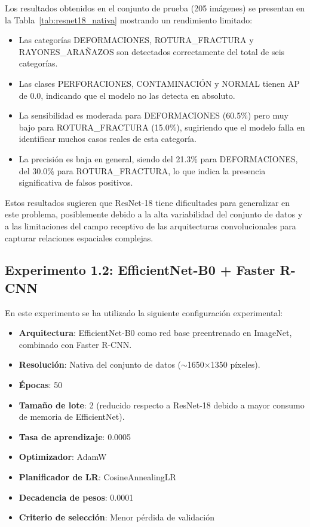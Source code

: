 Los resultados obtenidos en el conjunto de prueba (205 imágenes) se presentan en la Tabla~\ref{tab:resnet18_nativa} mostrando un rendimiento limitado:
\begin{itemize}
    \item Las categorías DEFORMACIONES, \mbox{ROTURA\_FRACTURA} y \mbox{RAYONES\_ARAÑAZOS} son detectados correctamente del total de seis categorías.
    \item Las clases PERFORACIONES, CONTAMINACIÓN y NORMAL tienen AP de 0.0, indicando que el modelo no las detecta en absoluto.
    \item La sensibilidad es moderada para DEFORMACIONES (60.5\%) pero muy bajo para \mbox{ROTURA\_FRACTURA} (15.0\%), sugiriendo que el modelo falla en identificar muchos casos reales de esta categoría.
    \item La precisión es baja en general, siendo del 21.3\% para DEFORMACIONES, del 30.0\% para \mbox{ROTURA\_FRACTURA}, lo que indica la presencia significativa de falsos positivos.
\end{itemize}

Estos resultados sugieren que ResNet-18 tiene dificultades para generalizar en este problema, posiblemente debido a la alta variabilidad del conjunto de datos y a las limitaciones del campo receptivo de las arquitecturas convolucionales para capturar relaciones espaciales complejas.

\subsection{Experimento 1.2: EfficientNet-B0 + Faster R-CNN}

En este experimento se ha utilizado la siguiente configuración experimental:
\begin{itemize}
    \item \textbf{Arquitectura}: EfficientNet-B0 como red base preentrenado en ImageNet, combinado con Faster R-CNN.
    \item \textbf{Resolución}: Nativa del conjunto de datos ($\sim$1650×1350 píxeles).
    \item \textbf{Épocas}: 50
    \item \textbf{Tamaño de lote}: 2 (reducido respecto a ResNet-18 debido a mayor consumo de memoria de EfficientNet).
    \item \textbf{Tasa de aprendizaje}: 0.0005
    \item \textbf{Optimizador}: AdamW
    \item \textbf{Planificador de LR}: CosineAnnealingLR
    \item \textbf{Decadencia de pesos}: 0.0001
    \item \textbf{Criterio de selección}: Menor pérdida de validación
\end{itemize}

